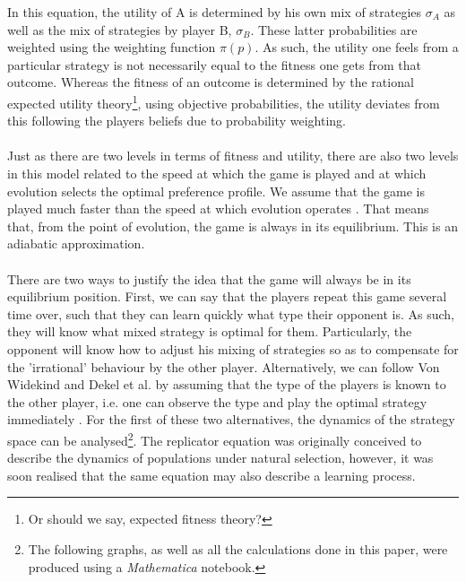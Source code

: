 \documentclass[a4paper,10pt]{article}
\numberwithin{equation}{section}
\begin{document}
In this equation, the utility of A is determined by his own mix of strategies $\sigma_A$ as well as the mix of strategies by player B, $\sigma_B$. These latter probabilities are weighted using the weighting function $\pi(p)$. As such, the utility one feels from a particular strategy is not necessarily equal to the fitness one gets from that outcome. Whereas the fitness of an outcome is determined by the rational expected utility theory\footnote{Or should we say, expected fitness theory?}, using objective probabilities, the utility deviates from this following the players beliefs due to probability weighting.\\
\\
Just as there are two levels in terms of fitness and utility, there are also two levels in this model related to the speed at which the game is played and at which evolution selects the optimal preference profile. We assume that the game is played much faster than the speed at which evolution operates \cite{Rieger2009}. That means that, from the point of evolution, the game is always in its equilibrium. This is an adiabatic approximation.\\
\\
There are two ways to justify the idea that the game will always be in its equilibrium position. First, we can say that the players repeat this game several time over, such that they can learn quickly what type their opponent is. As such, they will know what mixed strategy is optimal for them. Particularly, the opponent will know how to adjust his mixing of strategies so as to compensate for the 'irrational' behaviour by the other player. Alternatively, we can follow Von Widekind and Dekel et al. by assuming that the type of the players is known to the other player, i.e. one can observe the type and play the optimal strategy immediately \cite{Widekind2008, Dekel2007}. For the first of these two alternatives, the dynamics of the strategy space can be analysed\footnote{The following graphs, as well as all the calculations done in this paper, were produced using a \textit{Mathematica} notebook.}. The replicator equation was originally conceived to describe the dynamics of populations under natural selection, however, it was soon realised that the same equation may also describe a learning process.
 
\end{document}
